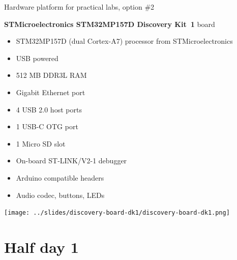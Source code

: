 \documentclass[a4paper,12pt,obeyspaces,spaces,hyphens]{article}
\begin{document}
\feagendatwocolumn
{Hardware platform for practical labs, option \#2}
{
  {\bf STMicroelectronics STM32MP157D Discovery Kit~1} board
  \begin{itemize}
  \item STM32MP157D (dual Cortex-A7) processor from STMicroelectronics
  \item USB powered
  \item 512 MB DDR3L RAM
  \item Gigabit Ethernet port
  \item 4 USB 2.0 host ports
  \item 1 USB-C OTG port
  \item 1 Micro SD slot
  \item On-board ST-LINK/V2-1 debugger
  \item Arduino compatible headers
  \item Audio codec, buttons, LEDs
  \end{itemize}
}
{}
{
  \begin{center}
    \texttt{[image: ../slides/discovery-board-dk1/discovery-board-dk1.png]}
  \end{center}
}

\section{Half day 1}
\end{document}
